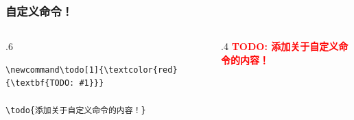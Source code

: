     \begin{frame}[fragile]
      \frametitle{自定义命令！}

      \begin{columns}
      \begin{column}{.6\textwidth}
      \begin{lstlisting}[basicstyle=\ttfamily\small]
\newcommand\todo[1]{\textcolor{red}{\textbf{TODO: #1}}}

\todo{添加关于自定义命令的内容！}
      \end{lstlisting}
      \end{column}
      \begin{column}{.4\textwidth}
      \newcommand\todo[1]{\textcolor{red}{\textbf{TODO: #1}}}
      \todo{添加关于自定义命令的内容！}
      \end{column}
      \end{columns}
    \end{frame}

